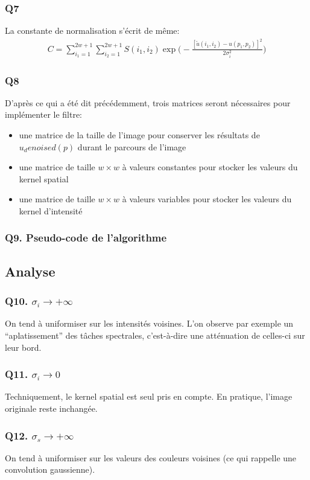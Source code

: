 \documentclass{article}
\begin{document}
\subsubsection*{Q7}
La constante de normalisation s'écrit de même:
\begin{equation*}\begin{split}
C = \displaystyle\sum_{i_1 = 1}^{2w + 1}
\displaystyle\sum_{i_2 = 1}^{2w + 1} S(i_1,i_2) \exp{ \big ( - \frac{[\tilde{u}(i_1, i_2) - u(p_1, p_2)]^2}{2\sigma_i^2} \big )}
\end{split}\end{equation*}
\subsubsection*{Q8}
D'après ce qui a été dit précédemment, trois matrices seront nécessaires pour implémenter le filtre:
\begin{itemize}
\item une matrice de la taille de l'image pour conserver les résultats de $u_denoised(p)$ durant le parcours de l'image
\item une matrice de taille $w \times w$ à valeurs constantes pour stocker les valeurs du kernel spatial
\item une matrice de taille $w \times w$ à valeurs variables pour stocker les valeurs du kernel d'intensité
\end{itemize}
\subsubsection*{Q9. Pseudo-code de l'algorithme}
\subsection{Analyse}
\subsubsection*{Q10. $\sigma_i \rightarrow + \infty $}
On tend à uniformiser sur les intensités voisines. L'on observe par exemple un ``aplatissement'' des tâches spectrales, c'est-à-dire une atténuation de celles-ci sur leur bord.
\subsubsection*{Q11. $\sigma_i \rightarrow 0 $}
Techniquement, le kernel spatial est seul pris en compte. En pratique, l'image originale reste inchangée.
\subsubsection*{Q12. $\sigma_s \rightarrow + \infty $}
On tend à uniformiser sur les valeurs des couleurs voisines (ce qui rappelle une convolution gaussienne).
\end{document}
